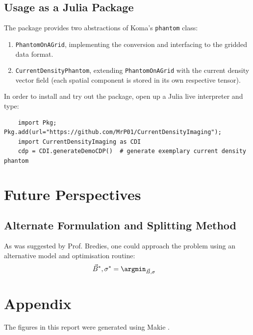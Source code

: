 \documentclass[10pt]{article}
\begin{document}
  \subsection{Usage as a Julia Package}
  The package provides two abstractions of Koma's \texttt{phantom} class:
  \begin{enumerate}
    \item \texttt{PhantomOnAGrid}, implementing the conversion and interfacing to the gridded data format.
    \item \texttt{CurrentDensityPhantom}, extending \texttt{PhantomOnAGrid} with the current density vector field (each spatial component is stored in its own respective tensor).
  \end{enumerate}

  In order to install and try out the package, open up a Julia live interpreter and type:
  \begin{verbatim}
    import Pkg; Pkg.add(url="https://github.com/MrP01/CurrentDensityImaging");
    import CurrentDensityImaging as CDI
    cdp = CDI.generateDemoCDP()  # generate exemplary current density phantom
  \end{verbatim}

  \section{Future Perspectives}
  \subsection{Alternate Formulation and Splitting Method}
  As was suggested by Prof. Bredies, one could approach the problem using an alternative model and optimisation routine:
  \begin{align*}
    \vec{B}^*, \sigma^* & = \argmin_{\vec{B}, \sigma}
  \end{align*}

  \vspace{4cm}

  \vspace{2cm}

  \pagebreak
  \printbibliography
  \printnoidxglossary[type=acronym, title={Acronyms}]

  \appendix
  \section{Appendix}
  The figures in this report were generated using Makie \parencite{2021-makie}.
\end{document}
